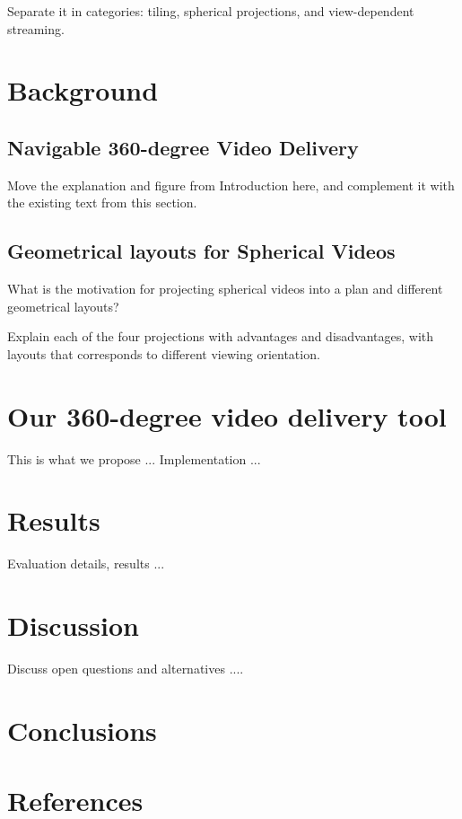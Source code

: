 Separate it in categories: tiling, spherical projections, and view-dependent streaming.

\section{Background}

\subsection{Navigable 360-degree Video Delivery}

Move the explanation and figure from Introduction here, and complement it with the existing text from this section.

\subsection{Geometrical layouts for Spherical Videos}

What is the motivation for projecting spherical videos into a plan and different geometrical layouts?

Explain each of the four projections with advantages and disadvantages, with layouts that corresponds to different viewing orientation.

\section{Our 360-degree video delivery tool}

This is what we propose ...
Implementation ...

\section{Results}

Evaluation details, results ...

\section{Discussion}

Discuss open questions and alternatives ....

\section{Conclusions}

\section{References}